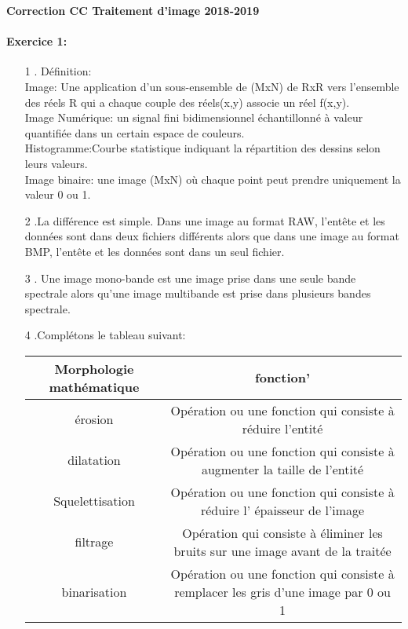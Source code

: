 \documentclass{article}
\begin{document}
\begin{center}\textbf{Correction CC Traitement d'image 2018-2019}
\end{center}
\paragraph{Exercice 1:\\}
\begin{itemize}
\item[1]. Définition:\\
Image: Une application d'un sous-ensemble de (MxN) de RxR vers l'ensemble des réels R qui a chaque couple des réels(x,y) associe un réel f(x,y).\\
Image Numérique: un signal fini bidimensionnel échantillonné à valeur quantifiée dans un certain espace de couleurs.\\
Histogramme:Courbe statistique indiquant la répartition des dessins selon leurs valeurs.\\
Image binaire: une image (MxN) où chaque point peut prendre uniquement la valeur 0 ou 1. 
\item[2].La différence est simple. Dans une image au format RAW, l’entête et les données sont dans deux fichiers différents alors que dans une image au format BMP, l’entête et les données sont dans un seul fichier.
\item[3]. Une image mono-bande est une image prise dans une seule bande spectrale alors qu'une image multibande est prise dans plusieurs bandes spectrale.
\item[4].Complétons le tableau suivant: \\
\begin{tabular}{|c|c|}
\hline
Morphologie mathématique & fonction'\\
\hline
érosion & Opération ou une fonction qui consiste à réduire l'entité\\
\hline
dilatation & Opération ou une fonction qui consiste à augmenter la taille de l'entité \\
\hline
Squelettisation &  Opération ou une fonction qui consiste à réduire l' épaisseur de l'image\\
\hline
filtrage & Opération qui consiste à éliminer les bruits sur une image avant de la traitée\\
\hline
binarisation & Opération ou une fonction qui consiste à remplacer les gris d'une image par 0 ou 1\\
\hline
\end{tabular}
\end{itemize}
\end{document}

